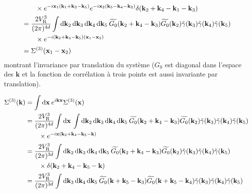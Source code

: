 \begin{align}
&\nonumber \qquad \times e^{-i\mathbf{x}_{\mathrm{1}} (\mathbf{k}_{\mathrm{1}}+\mathbf{k}_{\mathrm{3}}-\mathbf{k}_{\mathrm{5}})} e^{-i\mathbf{x}_{\mathrm{2}}(\mathbf{k}_{\mathrm{5}}-\mathbf{k}_{\mathrm{4}}-\mathbf{k}_{\mathrm{2}})} \delta(\mathbf{k}_{\mathrm{2}} +\mathbf{k}_{\mathrm{4}} -\mathbf{k}_{\mathrm{1}} -\mathbf{k}_{\mathrm{3}}) \\
&= \frac{2V_{\mathrm{R}}^3}{(2\pi)^{4d}} \int{\mathop{}\mathopen{}\mathrm{d}\mathbf{k}_{\mathrm{2}}\mathop{}\mathopen{}\mathrm{d}\mathbf{k}_{\mathrm{3}}\mathop{}\mathopen{}\mathrm{d}\mathbf{k}_{\mathrm{4}}\mathop{}\mathopen{}\mathrm{d}\mathbf{k}_{\mathrm{5}}\: \widetilde{G_0}(\mathbf{k}_{\mathrm{2}}+\mathbf{k}_{\mathrm{4}}-\mathbf{k}_{\mathrm{3}}) \widetilde{G_0}(\mathbf{k}_{\mathrm{2}})\tilde{\gamma}(\mathbf{k}_{\mathrm{3}})\tilde{\gamma}(\mathbf{k}_{\mathrm{4}})\tilde{\gamma}(\mathbf{k}_{\mathrm{5}})} \\
&\nonumber \qquad \times e^{-i(\mathbf{k}_{\mathrm{2}}+\mathbf{k}_{\mathrm{4}}-\mathbf{k}_{\mathrm{5}})(\mathbf{x}_{\mathrm{1}}-\mathbf{x}_{\mathrm{2}})}\\
&=\Sigma^{(3)}(\mathbf{x}_{\mathrm{1}}-\mathbf{x}_{\mathrm{2}})
\end{align}
montrant l'invariance par translation du système ($G_0$ est diagonal dans l'espace des $\mathbf{k}$ et la fonction de corrélation à trois points est aussi invariante par translation).

\begin{align}
\Sigma^{(3)}(\mathbf{k})&=\int{\mathop{}\mathopen{}\mathrm{d}\mathbf{x} \: e^{i \mathbf{k}\mathbf{x}} \Sigma^{(3)}(\mathbf{x})} \\
&= \frac{2V_{\mathrm{R}}^3}{(2\pi)^{4d}} \int{\mathop{}\mathopen{}\mathrm{d}\mathbf{x} \: \int{\mathop{}\mathopen{}\mathrm{d}\mathbf{k}_{\mathrm{2}}\mathop{}\mathopen{}\mathrm{d}\mathbf{k}_{\mathrm{3}}\mathop{}\mathopen{}\mathrm{d}\mathbf{k}_{\mathrm{4}}\mathop{}\mathopen{}\mathrm{d}\mathbf{k}_{\mathrm{5}}\: \widetilde{G_0}(\mathbf{k}_{\mathrm{2}}+\mathbf{k}_{\mathrm{4}}-\mathbf{k}_{\mathrm{3}}) \widetilde{G_0}(\mathbf{k}_{\mathrm{2}})\tilde{\gamma}(\mathbf{k}_{\mathrm{3}})\tilde{\gamma}(\mathbf{k}_{\mathrm{4}})\tilde{\gamma}(\mathbf{k}_{\mathrm{5}})}} \\
&\nonumber \qquad \times e^{-i \mathbf{x} (\mathbf{k}_{\mathrm{2}} + \mathbf{k}_{\mathrm{4}} - \mathbf{k}_{\mathrm{5}} - \mathbf{k})} \\
&= \frac{2V_{\mathrm{R}}^3}{(2\pi)^{3d}} \int{\mathop{}\mathopen{}\mathrm{d}\mathbf{k}_{\mathrm{2}}\mathop{}\mathopen{}\mathrm{d}\mathbf{k}_{\mathrm{3}}\mathop{}\mathopen{}\mathrm{d}\mathbf{k}_{\mathrm{4}}\mathop{}\mathopen{}\mathrm{d}\mathbf{k}_{\mathrm{5}}\: \widetilde{G_0}(\mathbf{k}_{\mathrm{2}}+\mathbf{k}_{\mathrm{4}}-\mathbf{k}_{\mathrm{3}}) \widetilde{G_0}(\mathbf{k}_{\mathrm{2}})\tilde{\gamma}(\mathbf{k}_{\mathrm{3}})\tilde{\gamma}(\mathbf{k}_{\mathrm{4}})\tilde{\gamma}(\mathbf{k}_{\mathrm{5}})}\\
&\nonumber \qquad \times\delta(\mathbf{k}_{\mathrm{2}} + \mathbf{k}_{\mathrm{4}} - \mathbf{k}_{\mathrm{5}} - \mathbf{k}) \\
&= \frac{2V_{\mathrm{R}}^3}{(2\pi)^{3d}} \int{\mathop{}\mathopen{}\mathrm{d}\mathbf{k}_{\mathrm{3}} \mathop{}\mathopen{}\mathrm{d}\mathbf{k}_{\mathrm{4}}\mathop{}\mathopen{}\mathrm{d}\mathbf{k}_{\mathrm{5}} \: \widetilde{G_0}(\mathbf{k}+\mathbf{k}_{\mathrm{5}}-\mathbf{k}_{\mathrm{3}}) \widetilde{G_0}(\mathbf{k}+\mathbf{k}_{\mathrm{5}}-\mathbf{k}_{\mathrm{4}})\tilde{\gamma}(\mathbf{k}_{\mathrm{3}})\tilde{\gamma}(\mathbf{k}_{\mathrm{4}})\tilde{\gamma}(\mathbf{k}_{\mathrm{5}})} 
\end{align}

